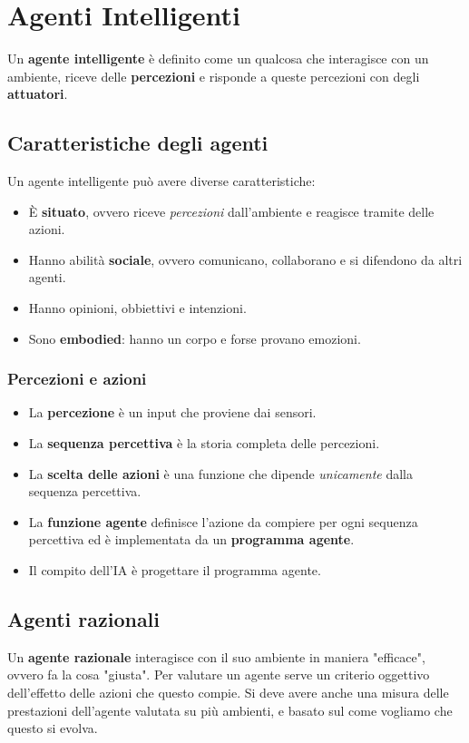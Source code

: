 \chapter{Agenti Intelligenti}
Un \textbf{agente intelligente} \`e definito come un qualcosa che interagisce con un
ambiente, riceve delle \textbf{percezioni} e risponde a queste percezioni con degli
\textbf{attuatori}.

\section{Caratteristiche degli agenti}
Un agente intelligente pu\`o avere diverse caratteristiche:
\begin{itemize}
	\item \`E \textbf{situato}, ovvero riceve \emph{percezioni} dall'ambiente e reagisce tramite
	      delle azioni.
	\item Hanno abilit\`a \textbf{sociale}, ovvero comunicano, collaborano e si difendono da
	      altri agenti.
	\item Hanno opinioni, obbiettivi e intenzioni.
	\item Sono \textbf{embodied}: hanno un corpo e forse provano emozioni.
\end{itemize}

\subsection{Percezioni e azioni}
\begin{itemize}
	\item La \textbf{percezione} \`e un input che proviene dai sensori.
	\item La \textbf{sequenza percettiva} \`e la storia completa delle percezioni.
	\item La \textbf{scelta delle azioni} \`e una funzione che dipende \emph{unicamente}
	      dalla sequenza percettiva.
	\item La \textbf{funzione agente} definisce l'azione da compiere per ogni sequenza
	      percettiva ed \`e implementata da un \textbf{programma agente}.
	\item Il compito dell'IA \`e progettare il programma agente.
\end{itemize}

\section{Agenti razionali}
Un \textbf{agente razionale} interagisce con il suo ambiente in maniera "efficace", ovvero
fa la cosa "giusta". Per valutare un agente serve un criterio oggettivo dell'effetto delle
azioni che questo compie. Si deve avere anche una misura delle prestazioni dell'agente
valutata su pi\`u ambienti, e basato sul come vogliamo che questo si evolva.

